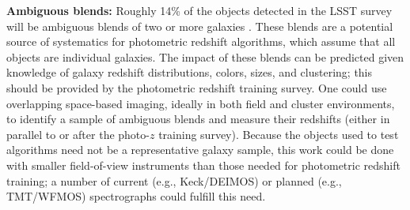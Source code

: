 %


{\bf Ambiguous blends:}
Roughly 14\% of the objects detected in the LSST survey will be ambiguous blends of two or
more galaxies \citep{Dawson}. These  blends are a potential source of systematics for photometric redshift algorithms, which assume that all objects are individual galaxies.
The impact of these blends can be predicted given knowledge of galaxy redshift distributions,
colors, sizes, and clustering; this should be provided by the photometric redshift training
survey. One could use overlapping space-based imaging, ideally in both field and cluster
environments, to identify a sample of ambiguous blends and measure their redshifts (either in
parallel to or after the photo-$z$ training survey).  Because the objects used to test algorithms
need not be a representative galaxy sample, this work could be done with smaller field-of-view instruments than those needed for photometric redshift training; a number of current (e.g., Keck/DEIMOS) or planned (e.g., TMT/WFMOS) spectrographs could fulfill this need.


